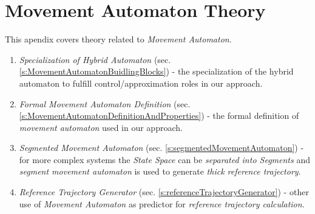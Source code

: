 \cleardoublepage

\chapter{Movement Automaton Theory}
\noindent This apendix covers theory related to \emph{Movement Automaton}.

\begin{enumerate}
	\item \emph{Specialization of Hybrid Automaton} (sec. \ref{s:MovementAutomatonBuidlingBlocks}) - the specialization of the hybrid automaton to fulfill control/approximation roles in our approach.
	
	\item \emph{Formal Movement Automaton Definition} (sec. \ref{s:MovementAutomatonDefinitionAndProperties}) - the formal definition of \emph{movement automaton} used in our approach.
    
    \item \emph{Segmented Movement Automaton} (sec. \ref{s:segmentedMovementAutomaton}) - for more complex systems the \emph{State Space} can be \emph{separated into Segments} and \emph{segment movement automaton} is used to generate \emph{thick reference trajectory}.
    
    \item \emph{Reference Trajectory Generator} (sec. \ref{s:referenceTrajectoryGenerator}) - other use of \emph{Movement Automaton} as predictor for \emph{reference trajectory calculation}.
\end{enumerate}